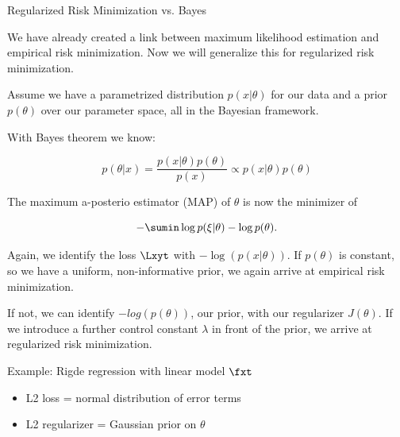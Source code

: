 \begin{vbframe}{Regularized Risk Minimization vs. Bayes}

We have already created a link between maximum likelihood estimation and empirical risk minimization.
Now we will generalize this for regularized risk minimization.

\lz

Assume we have a parametrized distribution $p(x | \theta)$ for our data and a prior $p(\theta)$ over our
parameter space, all in the Bayesian framework.

With Bayes theorem we know:

$$
p(\theta | x) = \frac{p(x | \theta) p(\theta) }{p(x)} \propto p(x | \theta) p(\theta)
$$

\framebreak

The maximum a-posterio estimator (MAP) of $\theta$ is now the minimizer of

$$
- \sumin \log p(\xi | \theta) - \log p(\theta).
$$

Again, we identify the loss $\Lxyt$ with $-\log(p(x | \theta))$. If $p(\theta)$ is constant, so we have a
  uniform, non-informative prior, we again arrive at empirical risk minimization.

\lz

If not, we can identify $-log(p(\theta))$, our prior, with our regularizer $J(\theta)$.
If we introduce a further control constant $\lambda$ in front of the prior,
we arrive at regularized risk minimization.

\lz

Example: Rigde regression with linear model $\fxt$
\begin{itemize}
\item L2 loss = normal distribution of error terms
\item L2 regularizer = Gaussian prior on $\theta$
\end{itemize}


\end{vbframe}


\endlecture
